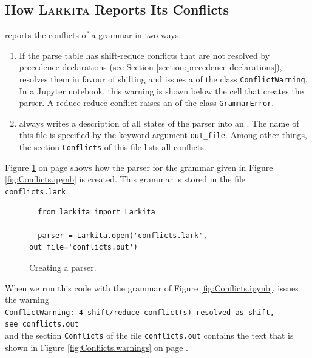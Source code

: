 \subsection{How \textsc{Larkita} Reports Its Conflicts}
 reports the conflicts of a grammar in two ways.
\begin{enumerate}
\item If the parse table has shift-reduce conflicts that are not resolved by precedence declarations (see
      Section \ref{section:precedence-declarations}),  resolves them in favour of shifting and
      issues a  of the class \texttt{ConflictWarning}.  In a Jupyter notebook, this warning is
      shown below the cell that creates the parser.  A reduce-reduce conflict raises an  of the
      class \texttt{GrammarError}.
\item {} always writes a description of all states of the parser into an .  The name of this file is specified by
      the keyword argument \texttt{out\_file}.  Among other things, the section \texttt{Conflicts} of this file
      lists all conflicts.
\end{enumerate}
Figure \ref{fig:conflicts-code} on page \pageref{fig:conflicts-code} shows how the parser for the grammar given
in Figure \ref{fig:Conflicts.ipynb} is created.  This grammar is stored in the file \texttt{conflicts.lark}.

\begin{figure}[!ht]
\centering
\begin{verbatim}
  from larkita import Larkita

  parser = Larkita.open('conflicts.lark', out_file='conflicts.out')
\end{verbatim}
\vspace*{-0.3cm}
\caption{Creating a parser.}
\label{fig:conflicts-code}
\end{figure}
\FloatBarrier

\noindent
When we run this code with the grammar of Figure \ref{fig:Conflicts.ipynb},  issues the
warning
\\[0.2cm]
\hspace*{1.3cm}
\texttt{ConflictWarning: 4 shift/reduce conflict(s) resolved as shift,}
\\
\hspace*{1.3cm}
\texttt{see conflicts.out}
\\[0.2cm]
and the section \texttt{Conflicts} of the file \texttt{conflicts.out} contains the text that is shown in Figure
\ref{fig:Conflicts.warnings} on page \pageref{fig:Conflicts.warnings}.

